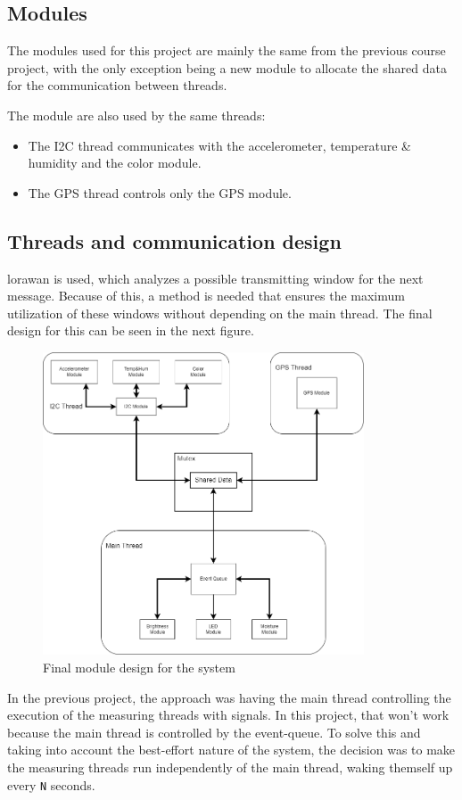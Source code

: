 \subsection{Modules}
The modules used for this project are mainly the same from the previous course project, with the only exception being a new module to allocate the shared data for the communication between threads.

The module are also used by the same threads:
\begin{itemize}
    \item The I2C thread communicates with the accelerometer, temperature \& humidity and the color module.
    \item The GPS thread controls only the GPS module.
\end{itemize}

\clearpage
\subsection{Threads and communication design} %

\acrshort{lorawan} is used, which analyzes a possible transmitting window for the next message. Because of this, a method is needed that ensures the maximum utilization of these windows without depending on the main thread. The final design for this can be seen in the next figure.

\begin{figure}[H]
    \centering
    \includegraphics[width=0.85\textwidth]{images/4/Modules.png}
    \caption{Final module design for the system}
    \label{fig:modules}
\end{figure}
In the previous project, the approach was having the main thread controlling the execution of the measuring threads with signals. In this project, that won't work because the main thread is controlled by the event-queue. 
To solve this and taking into account the best-effort nature of the system, the decision was to make the measuring threads run independently of the main thread, waking themself up every \texttt{N} seconds. 

